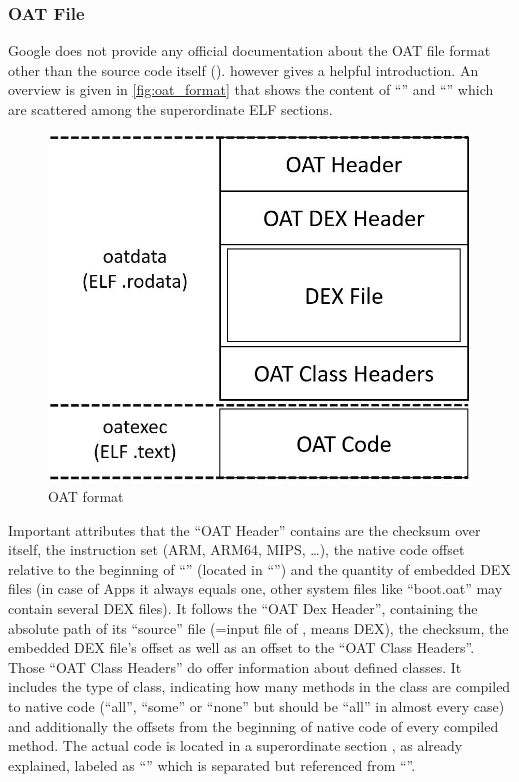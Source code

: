 \subsubsection{OAT File}\label{section:oat_file}
Google does not provide any official documentation about the OAT
file format other than the source code itself
(). \parencite{hiding_behind_art}
however gives a helpful introduction. An overview is given
in \autoref{fig:oat_format} that shows the content of ``'' and
``'' which are scattered among the superordinate ELF sections.

\begin{figure}[htb]
  \centering
  \includegraphics[scale=0.4]{figures/oat_format}
  \caption[OAT format]{OAT format}
  \label{fig:oat_format}
\end{figure}

Important attributes that the ``OAT Header'' contains are the
checksum over itself,
the instruction set (ARM, ARM64, MIPS, \ldots), the native code
offset relative to the beginning of ``'' (located in
``'') and the quantity of embedded
DEX files (in case of Apps it always equals one, other system files like
``boot.oat'' may contain several DEX files). It follows the
``OAT Dex Header'', containing
the absolute path of its ``source'' file (=input file of ,
means DEX), the checksum, the
embedded DEX file's offset as well as
an offset to the ``OAT Class Headers''. Those ``OAT Class Headers''
do offer information about defined classes. It includes the type
of class, indicating how many methods in the class
are compiled to native code (``all'', ``some'' or ``none'' but
should be ``all'' in almost every case) and additionally
the offsets from the beginning of native code of every compiled method.
The actual code is located in a superordinate section
, as already explained, labeled as ``'' which is separated but referenced from ``''.

